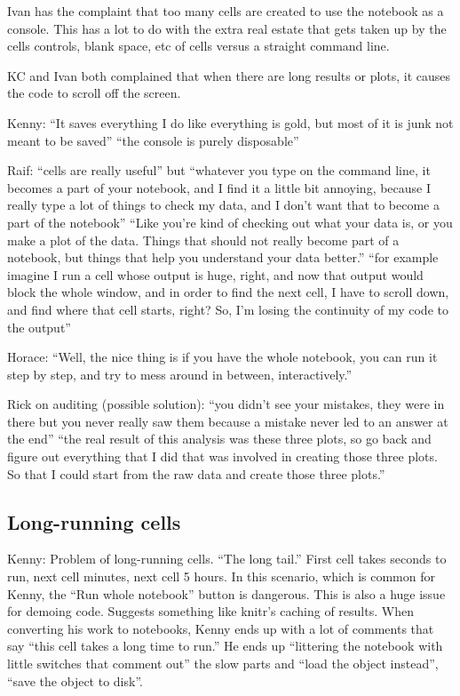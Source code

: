 Ivan has the complaint that too many cells are created to use the notebook as a console.  This has a lot to do with the extra real estate that gets taken up by the cells controls, blank space, etc of cells versus a straight command line.

KC and Ivan both complained that when there are long results or plots, it causes the code to scroll off the screen.

Kenny: ``It saves everything I do like everything is gold, but most of it is junk not meant to be saved'' ``the console is purely disposable''

Raif: ``cells are really useful'' but ``whatever you type on the command line, it becomes a part of your notebook, and I find it a little bit annoying, because I really type a lot of things to check my data, and I don't want that to become a part of the notebook'' ``Like you're kind of checking out what your data is, or you make a plot of the data. Things that should not really become part of a notebook, but things that help you understand your data better.'' ``for example imagine I run a cell whose output is huge, right, and now that output would block the whole window, and in order to find the next cell, I have to scroll down, and find where that cell starts, right? So, I'm losing the continuity of my code to the output''

Horace: ``Well, the nice thing is if you have the whole notebook, you can run it step by step, and try to mess around in between, interactively.''

Rick on auditing (possible solution): ``you didn't see your mistakes, they were in there but you never really saw them because a mistake never led to an answer at the end'' ``the real result of this analysis was these three plots, so go back and figure out everything that I did that was involved in creating those three plots. So that I could start from the raw data and create those three plots.''


\subsection{Long-running cells}
Kenny: Problem of long-running cells.  ``The long tail.''  First cell takes seconds to run, next cell minutes, next cell 5 hours.  In this scenario, which is common for Kenny, the ``Run whole notebook'' button is dangerous. This is also a huge issue for demoing code.  Suggests something like knitr's caching of results. When converting his work to notebooks, Kenny ends up with a lot of comments that say ``this cell takes a long time to run.'' He ends up ``littering the notebook with little switches that comment out'' the slow parts and ``load the object instead'', ``save the object to disk''.


